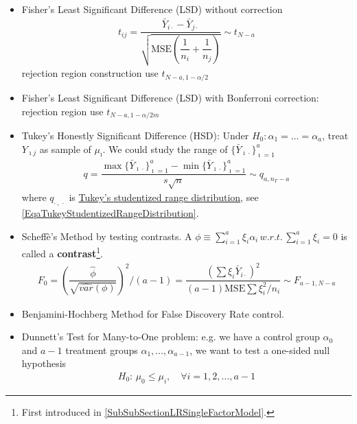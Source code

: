 \begin{itemize}[topsep=2pt,itemsep=0pt]
    \item Fisher's Least Significant Difference (LSD) without correction
    \begin{align}
        t_{ij}=\dfrac{ \bar{Y}_{i\cdot }-\bar{Y}_{j\cdot } }{ \sqrt{\mathrm{ MSE }\left(\dfrac{ 1 }{ n_i }+\dfrac{ 1 }{ n_j }  \right) } }\sim t_{N-a}  
    \end{align}
    rejection region construction use $ t_{N-a,1-\alpha /2} $
    \item Fisher's Least Significant Difference (LSD) with Bonferroni correction: rejection region use $ t_{N-a, 1-\alpha /2m} $
    \item Tukey's Honestly Significant Difference (HSD): Under $ H_0:\alpha _1=\ldots=\alpha _a $, treat $ Y_{\imath j} $ as sample of $ \mu _\imath $. We could study the range of $ \{\bar{Y}_{\imath\cdot }\}_{\imath=1}^a $
    \begin{align}
        q=\dfrac{ \max\{\bar{Y}_{\imath\cdot }\}_{\imath=1}^a-\min\{\bar{Y}_{\imath\cdot }\}_{\imath=1}^a }{ s\sqrt{n} }  \sim q_{a,n_T-a}
    \end{align}
    where $ q_{\cdot \, ,\, \cdot } $ is \hyperlink{TukeyStudentizedRangeDistribution}{Tukey's  studentized range distribution}, see \autoref{EqaTukeyStudentizedRangeDistribution}.
    \item Scheff\`{e}'s Method by testing contrasts. A $ \phi \equiv\sum_{i=1}^a\xi _i\alpha _i  \,w.r.t.\,\sum_{i=1}^a\xi _i=0$ is called a \textbf{contrast}\footnote{First introduced in \autoref{SubSubSectionLRSingleFactorModel}.}. 
    \begin{align}
         F_0=\left(\dfrac{ \hat{\phi } }{ \sqrt{\hat{var}(\phi )} }\right)^2\big/(a-1)=\dfrac{ (\sum \xi_i\bar{Y}_{i\cdot })^2 }{ (a-1)\mathrm{ MSE }\sum \xi _i^2/n_i  } \sim F_{a-1,N-a}
    \end{align}
    \item Benjamini-Hochberg Method for False Discovery Rate control.
    \item Dunnett's Test for Many-to-One problem: e.g. we have a control group $ \alpha _0 $ and $ a-1 $ treatment groups $ \alpha _1,\ldots,\alpha _{a-1} $, we want to test a one-sided null hypothesis 
    \begin{align*}
        H_0:\, \mu _0\leq \mu _i,\quad \forall i=1,2,\ldots,a-1 
    \end{align*}


\end{itemize}
